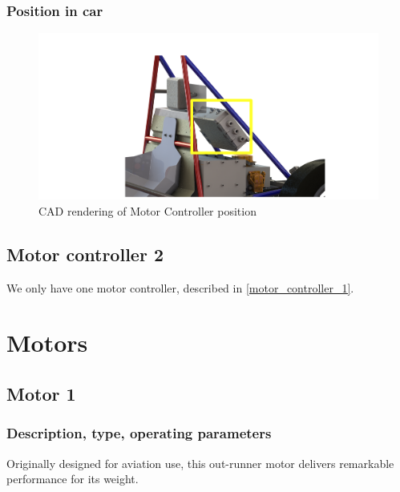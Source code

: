 \documentclass{article}
\begin{document}
\subsubsection{Position in car}
\begin{figure}[H]
    \centering
    \includegraphics[scale=1]{MotorController3-1-17.png}
    \caption{CAD rendering of Motor Controller position}
    \label{mc_cad}
\end{figure}

\subsection{Motor controller 2}
We only have one motor controller, described in \ref{motor_controller_1}.

\section{Motors}\label{motors}
\subsection{Motor 1}\label{motor_1}

\subsubsection{Description, type, operating parameters}
Originally designed for aviation use, this out-runner motor delivers remarkable performance for its weight. 
\end{document}
